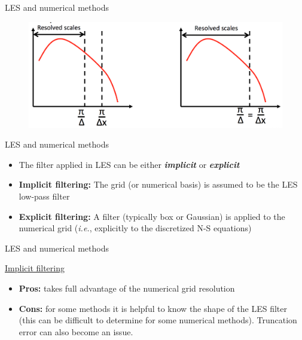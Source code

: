 
\begin{frame}{LES and numerical methods}

\begin{figure}
	\includegraphics[width=\textwidth]{methods1}
\end{figure}

\end{frame}


\begin{frame}{LES and numerical methods}

\begin{itemize}
\item The filter applied in LES can be either \textbf{\textit{implicit}} or \textbf{\textit{explicit}}
\item \textbf{Implicit filtering:} The grid (or numerical basis) is assumed to be the LES low-pass
filter
\item \textbf{Explicit filtering:} A filter (typically box or Gaussian) is applied to the numerical grid (\textit{i.e.}, explicitly to the discretized N-S equations)
\end{itemize}

\end{frame}


\begin{frame}{LES and numerical methods}

\underline{Implicit filtering}
\begin{itemize}
\item \textbf{Pros:} takes full advantage of the numerical grid resolution
\item \textbf{Cons:} for some methods it is helpful to know the shape of the LES filter (this can be difficult to determine for some numerical methods). Truncation error can also become an issue.
\end{itemize}
\end{frame}

